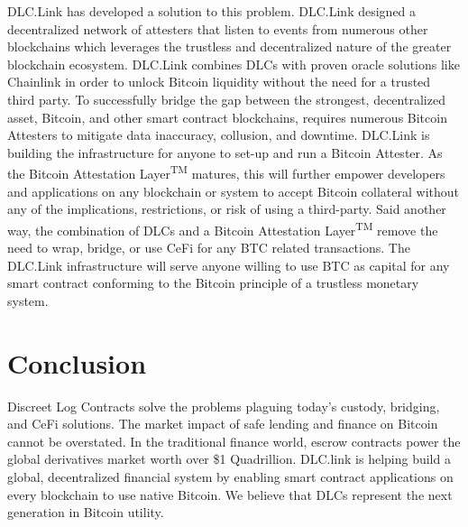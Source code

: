 \documentclass[twoside, a4paper, 11pt]{article}
\begin{document}
  DLC.Link has developed a solution to this problem. DLC.Link designed a decentralized network of attesters that listen to events from numerous other blockchains which leverages the trustless and decentralized nature of the greater blockchain ecosystem. DLC.Link combines DLCs with proven oracle solutions like Chainlink in order to unlock Bitcoin liquidity without the need for a trusted third party. To successfully bridge the gap between the strongest, decentralized asset, Bitcoin, and other smart contract blockchains, requires numerous Bitcoin Attesters to mitigate data inaccuracy, collusion, and downtime. DLC.Link is building the infrastructure for anyone to set-up and run a Bitcoin Attester. As the Bitcoin Attestation Layer\textsuperscript{TM} matures, this will further empower developers and applications on any blockchain or system to accept Bitcoin collateral without any of the implications, restrictions, or risk of using a third-party. Said another way, the combination of DLCs and a Bitcoin Attestation Layer\textsuperscript{TM} remove the need to wrap, bridge, or use CeFi for any BTC related transactions. The DLC.Link infrastructure will serve anyone willing to use BTC as capital for any smart contract conforming to the Bitcoin principle of a trustless monetary system.

  \section{Conclusion}

  Discreet Log Contracts solve the problems plaguing today’s custody, bridging, and CeFi solutions. The market impact of safe lending and finance on Bitcoin cannot be overstated. In the traditional finance world, escrow contracts power the global derivatives market worth over \$1 Quadrillion. DLC.link is helping build a global, decentralized financial system by enabling smart contract applications on every blockchain to use native Bitcoin. We believe that DLCs represent the next generation in Bitcoin utility.
\end{document}
